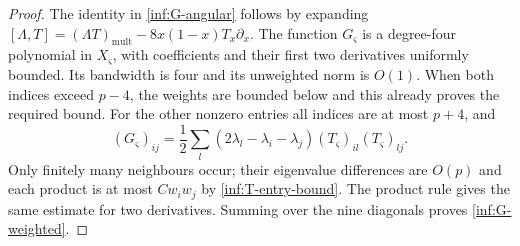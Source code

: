 \begin{proof}
The identity in \eqref{inf:G-angular} follows by expanding
$[\Lambda,T]= (\Lambda T)_{\mathrm{mult}}
-8x(1-x)T_x\partial_x$.
The function $G_\varsigma$ is a degree-four polynomial in $X_\varsigma$, with
coefficients and their first two derivatives uniformly bounded.
Its bandwidth is four and its unweighted norm is $O(1)$.
When both indices exceed $p-4$, the weights are bounded below and
this already proves the required bound.
For the other nonzero entries all indices are at most $p+4$, and
\[
 (G_\varsigma)_{ij}=\frac12\sum_l(2\lambda_l-\lambda_i-\lambda_j)
                                 (T_\varsigma)_{il}(T_\varsigma)_{lj}.
\]
Only finitely many neighbours occur; their eigenvalue differences
are $O(p)$ and each product is at most $Cw_iw_j$ by
\eqref{inf:T-entry-bound}. The product rule gives the same estimate
for two derivatives. Summing over the nine diagonals proves
\eqref{inf:G-weighted}.
\end{proof}

